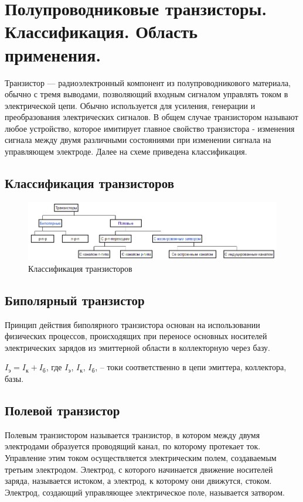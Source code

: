\documentclass[unicode, 12pt, a4paper, oneside]{article}
\begin{document}
\section{Полупроводниковые транзисторы. Классификация. Область применения.}

Транзистор — радиоэлектронный компонент из полупроводникового материала, обычно с тремя выводами, позволяющий входным сигналом управлять током в электрической цепи. Обычно используется для усиления, генерации и преобразования электрических сигналов. В общем случае транзистором называют любое устройство, которое имитирует главное свойство транзистора - изменения сигнала между двумя различными состояниями при изменении сигнала на управляющем электроде. Далее на схеме приведена классификация.

\subsection*{Классификация транзисторов}

\begin{figure}[H]
\centering
\includegraphics[width=1.0\textwidth]{3_Scheme_of_types.png}
\caption{Классификация транзисторов}
\label{fig:3_Scheme_of_types}
\end{figure}

\subsection*{Биполярный транзистор}

Принцип действия биполярного транзистора основан на использовании физических процессов, происходящих при переносе основных носителей электрических зарядов из эмиттерной области в коллекторную через базу.

$I_\text{э} = I_\text{к} + I_\text{б}$, где $I_\text{э}$, $I_\text{к}$, $I_\text{б}$, – токи соответственно в цепи эмиттера, коллектора, базы.

\subsection*{Полевой транзистор}

Полевым транзистором называется транзистор, в котором между двумя электродами образуется проводящий канал, по которому протекает ток. Управление этим током осуществляется электрическим полем, создаваемым третьим электродом. Электрод, с которого начинается движение носителей заряда, называется истоком, а электрод, к которому они движутся, стоком. Электрод, создающий управляющее электрическое поле, называется затвором.
\end{document}

